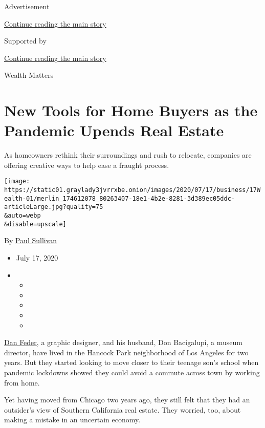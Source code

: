 Advertisement

\protect\hyperlink{after-top}{Continue reading the main story}

Supported by

\protect\hyperlink{after-sponsor}{Continue reading the main story}

Wealth Matters

\hypertarget{new-tools-for-home-buyers-as-the-pandemic-upends-real-estate}{%
\section{New Tools for Home Buyers as the Pandemic Upends Real
Estate}\label{new-tools-for-home-buyers-as-the-pandemic-upends-real-estate}}

As homeowners rethink their surroundings and rush to relocate, companies
are offering creative ways to help ease a fraught process.

\texttt{[image: https://static01.graylady3jvrrxbe.onion/images/2020/07/17/business/17Wealth-01/merlin\_174612078\_80263407-18e1-4b2e-8281-3d389ec05ddc-articleLarge.jpg?quality=75\\\&auto=webp\\\&disable=upscale]}

By \href{https://www.nytimes3xbfgragh.onion/by/paul-sullivan}{Paul
Sullivan}

\begin{itemize}
\item
  July 17, 2020
\item
  \begin{itemize}
  \item
  \item
  \item
  \item
  \item
  \end{itemize}
\end{itemize}

\href{https://tmagazine.blogs.nytimes3xbfgragh.onion/2012/03/27/a-bold-move/}{Dan
Feder}, a graphic designer, and his husband, Don Bacigalupi, a museum
director, have lived in the Hancock Park neighborhood of Los Angeles for
two years. But they started looking to move closer to their teenage
son's school when pandemic lockdowns showed they could avoid a commute
across town by working from home.

Yet having moved from Chicago two years ago, they still felt that they
had an outsider's view of Southern California real estate. They worried,
too, about making a mistake in an uncertain economy.

